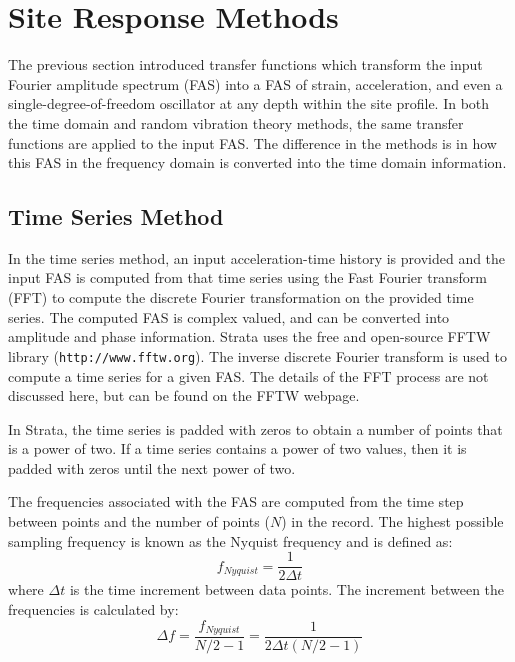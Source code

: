\documentclass[12pt,oneside]{book}
\begin{document}
\section{Site Response Methods}\label{ch:sra:methods}
The previous section introduced transfer functions which transform the input Fourier amplitude
spectrum (FAS) into a FAS of strain, acceleration, and even a single-degree-of-freedom oscillator at
any depth within the site profile.  In both the time domain and random vibration theory methods, the
same transfer functions are applied to the input FAS.  The difference in the methods is in how this
FAS in the frequency domain is converted into the time domain information.

\subsection{Time Series Method}\label{ch:sra:methods:timeSeries}
In the time series method, an input acceleration-time history is provided and
the input FAS is computed from that time series using the Fast Fourier transform
(FFT) to compute the discrete Fourier
transformation on the provided time series.  The computed FAS is complex valued,
and can be converted into amplitude and phase information.  Strata uses the free
and open-source FFTW library (\texttt{http://www.fftw.org}). The inverse
discrete Fourier transform is used to compute a time series for a given FAS.
The details of the FFT process are not discussed here, but can be found on the
FFTW webpage.

In Strata, the time series is padded with zeros to obtain a number of points that is a power of two.
If a time series contains a power of two values, then it is padded with zeros until the next power
of two.

The frequencies associated with the FAS are computed from the time step between points and the
number of points ($N$) in the record.  The highest possible sampling frequency is known as the
Nyquist frequency and is defined as:
\begin{equation}
    f_{Nyquist} = \frac{1}{2 \Delta t}
\end{equation}
where $\Delta t$ is the time increment between data points.  The increment between the frequencies
is calculated by:
\begin{equation}
    \Delta f = \frac{f_{Nyquist}}{N/2-1} = \frac{1}{ 2 \Delta t \left( N/2 - 1 \right)}
\end{equation}
\end{document}
